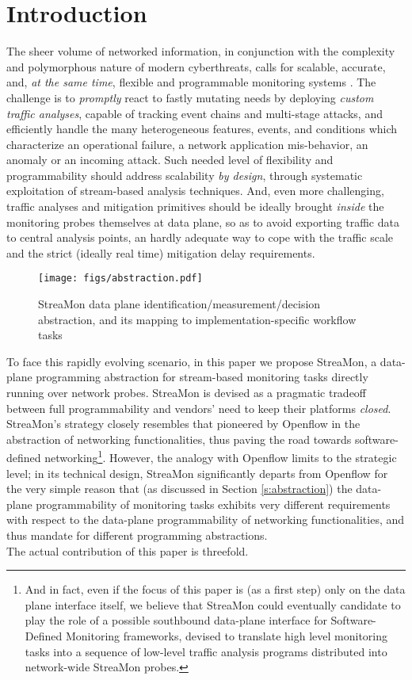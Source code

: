 \documentclass[conference,letterpaper]{sig-alternate-10pt}
\begin{document}
\section{Introduction}
\label{s:intro}
The sheer volume of networked information, in conjunction 
with the complexity and polymorphous nature of modern cyberthreats, 
calls for scalable, accurate, and, {\em at the same time}, flexible 
and programmable monitoring systems \cite{deri10, dain12}. 
The challenge is to {\em promptly} react to fastly mutating needs by 
deploying {\em custom traffic analyses}, capable of tracking event chains 
and multi-stage attacks, and efficiently handle the many heterogeneous 
features, events, and conditions which characterize an operational failure, 
a network application mis-behavior, an anomaly or an incoming attack. 
Such needed level of flexibility and programmability should address 
scalability {\em by design}, through systematic exploitation of 
stream-based analysis techniques. And, even more challenging, traffic 
analyses and mitigation primitives should be ideally brought 
{\em inside} the monitoring probes themselves at data plane, so as to avoid 
exporting traffic data to central analysis points, an hardly adequate way 
to cope with the traffic scale and the strict (ideally real time) mitigation 
delay requirements. 

\begin{figure*}[t]
\centering
   \texttt{[image: figs/abstraction.pdf]}
\caption{StreaMon data plane identification/measurement/decision abstraction, and its mapping to implementation-specific workflow tasks}
\vspace*{-.5cm}
\label{fig:logic-wf}
\end{figure*}


To face this rapidly evolving scenario, in this paper we propose StreaMon, a data-plane 
programming abstraction for stream-based monitoring tasks directly running over network probes. 
StreaMon is devised as a pragmatic tradeoff between full programmability and 
vendors' need to keep their platforms {\em closed}. StreaMon's strategy  
closely resembles that pioneered by Openflow \cite{OF08} in the abstraction 
of networking functionalities, thus paving the road towards software-defined networking\footnote{
	And in fact, even if the focus of this paper is (as a first step) only on the data plane 
	interface itself, we believe that StreaMon could eventually candidate to play the 
	role of a possible southbound data-plane interface for Software-Defined Monitoring frameworks, 
	devised to translate high level monitoring tasks into a sequence of low-level 
	traffic analysis programs distributed into network-wide StreaMon probes.}. 
However, the analogy with Openflow limits to the strategic level; in its technical design, 
StreaMon significantly departs from Openflow for the very simple reason that (as 
discussed in Section \ref{s:abstraction}) the data-plane programmability of monitoring tasks 
exhibits very different requirements with respect to the data-plane programmability of networking 
functionalities, and thus mandate for different programming abstractions. \\
The actual contribution of this paper is threefold. 
\end{document}
